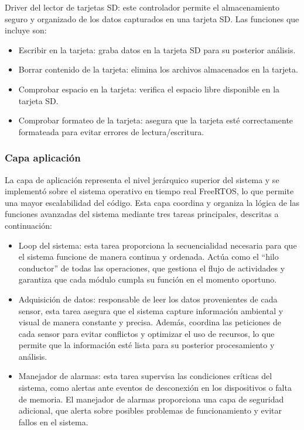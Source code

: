 Driver del lector de tarjetas SD: este controlador permite el almacenamiento seguro y organizado de los datos capturados en una tarjeta SD. Las funciones que incluye son:
\begin{itemize}
\item Escribir en la tarjeta: graba datos en la tarjeta SD para su posterior análisis.
\item Borrar contenido de la tarjeta: elimina los archivos almacenados en la tarjeta.
\item Comprobar espacio en la tarjeta: verifica el espacio libre disponible en la tarjeta SD.
\item Comprobar formateo de la tarjeta: asegura que la tarjeta esté correctamente formateada para evitar errores de lectura/escritura.
\end{itemize}

\subsubsection{Capa aplicación}
\label{capa_aplicacion}

La capa de aplicación representa el nivel jerárquico superior del sistema y se implementó sobre el sistema operativo en tiempo real FreeRTOS, lo que permite una mayor escalabilidad del código. Esta capa coordina y organiza la lógica de las funciones avanzadas del sistema mediante tres tareas principales, descritas a continuación:

\begin{itemize}
\item Loop del sistema: esta tarea proporciona la secuencialidad necesaria para que el sistema funcione de manera continua y ordenada. Actúa como el “hilo conductor” de todas las operaciones, que gestiona el flujo de actividades y garantiza que cada módulo cumpla su función en el momento oportuno.
\item Adquisición de datos: responsable de leer los datos provenientes de cada sensor, esta tarea asegura que el sistema capture información ambiental y visual de manera constante y precisa. Además, coordina las peticiones de cada sensor para evitar conflictos y optimizar el uso de recursos, lo que permite que la información esté lista para su posterior procesamiento y análisis.
\item Manejador de alarmas: esta tarea supervisa las condiciones críticas del sistema, como alertas ante eventos de desconexión en los dispositivos o falta de memoria. El manejador de alarmas proporciona una capa de seguridad adicional, que alerta sobre posibles problemas de funcionamiento y evitar fallos en el sistema.
\end{itemize}


